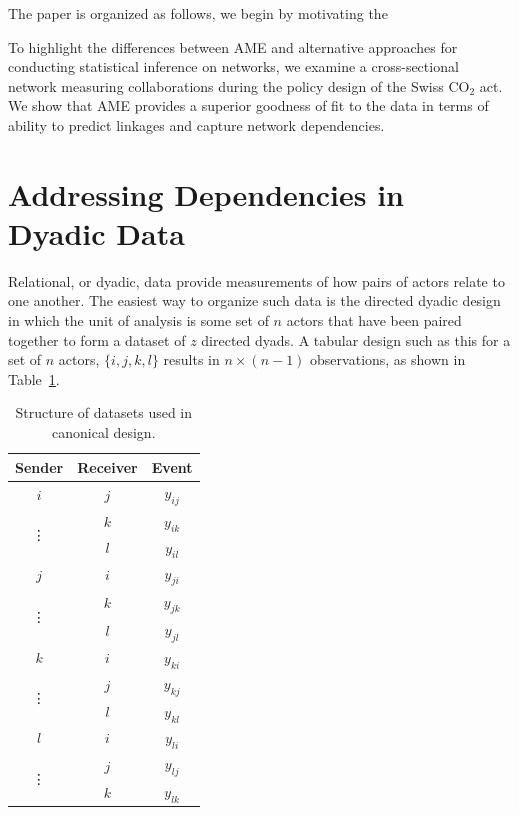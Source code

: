 \documentclass[12pt,pdflatex]{elsarticle}
\begin{document}
The paper is organized as follows, we begin by motivating the 

To highlight the differences between AME and alternative approaches for conducting statistical inference on networks, we examine a cross-sectional network measuring collaborations during the policy design of the Swiss CO$_{2}$ act. We show that AME provides a superior goodness of fit to the data in terms of ability to predict linkages and capture network dependencies. 
\\

\section*{\textbf{Addressing Dependencies in Dyadic Data}}


Relational, or dyadic, data provide measurements of how pairs of actors relate to one another. The easiest way to organize such data is the directed dyadic design in which the unit of analysis is some set of $n$ actors that have been paired together to form a dataset of $z$ directed dyads. A tabular design such as this for a set of $n$ actors, $\{i, j, k, l \}$ results in $n \times (n-1)$ observations, as shown in Table~\ref{tab:canDesign}. 

\begin{table}[ht]
	\centering
		\centering
		\setlength{\tabcolsep}{10pt}
		\caption{Structure of datasets used in canonical design.} 	%
		\begin{tabular}{ccc}
			Sender & Receiver & Event \\
			\hline\hline
			$i$ & $j$ & $y_{ij}$ \\
			\multirow{2}{*}{\vdots} & $k$ & $y_{ik}$ \\
			~ & $l$ & $y_{il}$ \\
			$j$ & $i$ & $y_{ji}$ \\
			\multirow{2}{*}{\vdots} & $k$ & $y_{jk}$ \\
			~ & $l$ & $y_{jl}$ \\
			$k$ & $i$ & $y_{ki}$ \\
			\multirow{2}{*}{\vdots} & $j$ & $y_{kj}$ \\
			~ & $l$ & $y_{kl}$ \\
			$l$ & $i$ & $y_{li}$ \\
			\multirow{2}{*}{\vdots} & $j$ & $y_{lj}$ \\
			~ & $k$ & $y_{lk}$ \\
			\hline\hline
		\end{tabular}
		\label{tab:canDesign}
\end{table}        
\end{document}
